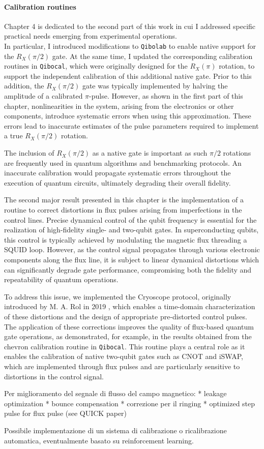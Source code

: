 \paragraph{Calibration routines}
Chapter 4 is dedicated to the second part of this work in cui I addressed specific practical needs emerging from experimental operations.\\
In particular, I introduced modifications to \texttt{Qibolab} to enable native support for the $R_X(\pi/2)$ gate. 
At the same time, I updated the corresponding calibration routines in \texttt{Qibocal}, which were originally designed for the $R_X(\pi)$ rotation, to support the independent calibration of this additional native gate.
Prior to this addition, the $R_X(\pi/2)$ gate was typically implemented by halving the amplitude of a calibrated $\pi$-pulse. 
However, as shown in the first part of this chapter, nonlinearities in the system, arising from the electronics or other components, introduce systematic errors when using this approximation. These errors lead to inaccurate estimates of the pulse parameters required to implement a true $R_X(\pi/2)$ rotation.

The inclusion of $R_X(\pi/2)$ as a native gate is important as such $\pi/2$ rotations are frequently used in quantum algorithms and benchmarking protocols. An inaccurate calibration would propagate systematic errors throughout the execution of quantum circuits, ultimately degrading their overall fidelity.

The second major result presented in this chapter is the implementation of a routine to correct distortions in flux pulses arising from imperfections in the control lines. Precise dynamical control of the qubit frequency is essential for the realization of high-fidelity single- and two-qubit gates. 
In superconducting qubits, this control is typically achieved by modulating the magnetic flux threading a SQUID loop. However, as the control signal propagates through various electronic components along the flux line, it is subject to linear dynamical distortions which can significantly degrade gate performance, compromising both the fidelity and repeatability of quantum operations.

To address this issue, we implemented the Cryoscope protocol, originally introduced by M. A. Rol in 2019 \cite{rol_time-domain_2020}, which enables a time-domain characterization of these distortions and the design of appropriate pre-distorted control pulses. 
The application of these corrections improves the quality of flux-based quantum gate operations, as demonstrated, for example, in the results obtained from the chevron calibration routine in \texttt{Qibocal}. 
This routine plays a central role as it enables the calibration of native two-qubit gates such as CNOT and iSWAP, which are implemented through flux pulses and are particularly sensitive to distortions in the control signal.


Per miglioramento del segnale di flusso del campo magnetico:
* leakage optimization
* bounce compensation
* correzione per il ringing
* optimized step pulse for flux pulse (see QUICK paper)

Possibile implementazione di un sistema di calibrazione o ricalibrazione automatica, eventualmente basato su reinforcement learning.